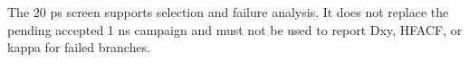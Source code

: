 The 20 ps screen supports selection and failure analysis. It does not replace the pending accepted 1 ns campaign and must not be used to report Dxy, HFACF, or kappa for failed branches.
